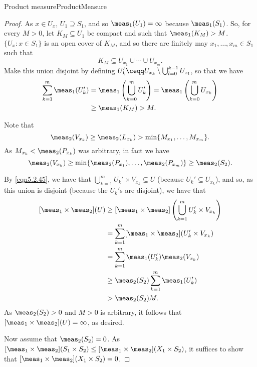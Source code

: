 \begin{thm}{Product measure}{ProductMeasure}
\begin{proof}
As $x\in U_x$, $U_1\supseteq S_1$, and so $\meas _1(U_1)=\infty$ because $\meas _1(S_1)$.  So, for every $M>0$, let $K_M\subseteq U_1$ be compact and such that $\meas _1(K_M)>M$.  $\{ U_x:x\in S_1\}$ is an open cover of $K_M$, and so there are finitely may $x_1,\ldots ,x_m\in S_1$ such that
\begin{equation}
K_M\subseteq U_{x_1}\cup \cdots \cup U_{x_m}.
\end{equation}
Make this union disjoint by defining $U_k'\ceqq U_{x_k}\setminus \bigcup _{l=0}^{k-1}U_{x_l}$, so that we have
\begin{equation}
\begin{split}
\sum _{k=1}^m\meas _1(U_k') & =\meas _1\left( \bigcup _{k=0}^mU_k'\right) =\meas _1\left( \bigcup _{k=0}^mU_{x_k}\right) \\
& \geq \meas _1(K_M)>M.
\end{split}
\end{equation}

Note that
\begin{equation}
\meas _2(V_{x_k})\geq \meas _2(L_{x_k})>\min \{ M_{x_1},\ldots ,M_{x_m}\} .
\end{equation}
As $M_{x_k}<\meas _2(P_{x_k})$ was arbitrary, in fact we have
\begin{equation}
\meas _2(V_{x_k})\geq \min \{ \meas _2(P_{x_1}),\ldots ,\meas _2(P_{x_m})\} \geq \meas _2(S_2).
\end{equation}

By \eqref{eqn5.2.45}, we have that $\bigcup _{k=1}^mU_k'\times V_{x_k}\subseteq U$ (because $U_k'\subseteq U_{x_k}$), and so, as this union is disjoint (because the $U_k'$s are disjoint), we have that
\begin{equation}
\begin{split}
[\meas _1\times \meas _2](U) & \geq [\meas _1\times \meas _2]\left( \bigcup _{k=1}^mU_k'\times V_{x_k}\right) \\
& =\sum _{k=1}^m[\meas _1\times \meas _2](U_k'\times V_{x_k}) \\
& =\sum _{k=1}^m\meas _1(U_k')\meas _2(V_{x_k}) \\
& \geq \meas _2(S_2)\sum _{k=1}^m\meas _1(U_k') \\
& >\meas _2(S_2)M.
\end{split}
\end{equation}
As $\meas _2(S_2)>0$ and $M>0$ is arbitrary, it follows that $[\meas _1\times \meas _2](U)=\infty$, as desired.

Now assume that $\meas _2(S_2)=0$.  As $[\meas _1\times \meas _2](S_1\times S_2)\leq [\meas _1\times \meas _2](X_1\times S_2)$, it suffices to show that $[\meas _1\times \meas _2](X_1\times S_2)=0$.


\end{proof}
\end{thm}
